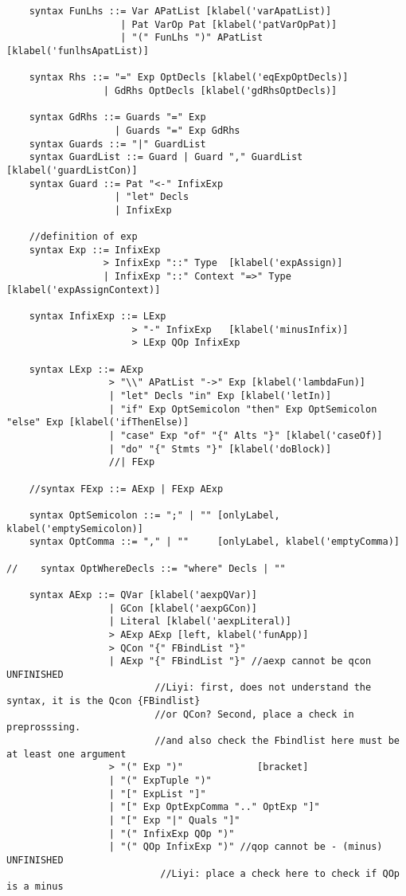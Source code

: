 \begin{lstlisting}
    syntax FunLhs ::= Var APatList [klabel('varApatList)]
                    | Pat VarOp Pat [klabel('patVarOpPat)]
                    | "(" FunLhs ")" APatList [klabel('funlhsApatList)]

    syntax Rhs ::= "=" Exp OptDecls [klabel('eqExpOptDecls)]
                 | GdRhs OptDecls [klabel('gdRhsOptDecls)]

    syntax GdRhs ::= Guards "=" Exp
                   | Guards "=" Exp GdRhs
    syntax Guards ::= "|" GuardList
    syntax GuardList ::= Guard | Guard "," GuardList  [klabel('guardListCon)]
    syntax Guard ::= Pat "<-" InfixExp
                   | "let" Decls
                   | InfixExp

    //definition of exp
    syntax Exp ::= InfixExp
                 > InfixExp "::" Type  [klabel('expAssign)]
                 | InfixExp "::" Context "=>" Type  [klabel('expAssignContext)]

    syntax InfixExp ::= LExp
                      > "-" InfixExp   [klabel('minusInfix)]
                      > LExp QOp InfixExp

    syntax LExp ::= AExp
                  > "\\" APatList "->" Exp [klabel('lambdaFun)]
                  | "let" Decls "in" Exp [klabel('letIn)]
                  | "if" Exp OptSemicolon "then" Exp OptSemicolon "else" Exp [klabel('ifThenElse)]
                  | "case" Exp "of" "{" Alts "}" [klabel('caseOf)]
                  | "do" "{" Stmts "}" [klabel('doBlock)]
                  //| FExp

    //syntax FExp ::= AExp | FExp AExp

    syntax OptSemicolon ::= ";" | "" [onlyLabel, klabel('emptySemicolon)]
    syntax OptComma ::= "," | ""     [onlyLabel, klabel('emptyComma)]

//    syntax OptWhereDecls ::= "where" Decls | ""

    syntax AExp ::= QVar [klabel('aexpQVar)]
                  | GCon [klabel('aexpGCon)]
                  | Literal [klabel('aexpLiteral)]
                  > AExp AExp [left, klabel('funApp)]
                  > QCon "{" FBindList "}"
                  | AExp "{" FBindList "}" //aexp cannot be qcon UNFINISHED
                          //Liyi: first, does not understand the syntax, it is the Qcon {FBindlist}
                          //or QCon? Second, place a check in preprosssing.
                          //and also check the Fbindlist here must be at least one argument
                  > "(" Exp ")"             [bracket]
                  | "(" ExpTuple ")"
                  | "[" ExpList "]"
                  | "[" Exp OptExpComma ".." OptExp "]"
                  | "[" Exp "|" Quals "]"
                  | "(" InfixExp QOp ")"
                  | "(" QOp InfixExp ")" //qop cannot be - (minus) UNFINISHED
                           //Liyi: place a check here to check if QOp is a minus


\end{lstlisting}
